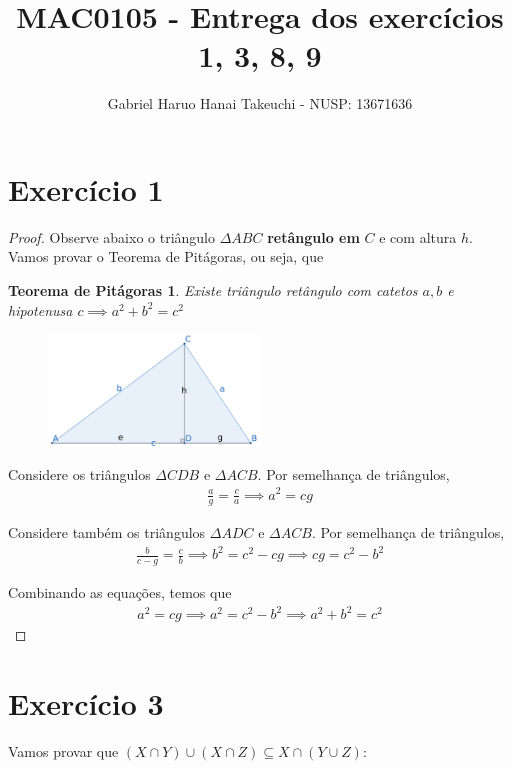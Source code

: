 \documentclass{article}
\title{MAC0105 - Entrega dos exercícios 1, 3, 8, 9}
\author{Gabriel Haruo Hanai Takeuchi - NUSP: 13671636}
\date{}
\newtheorem*{pit}{Teorema de Pitágoras}
\begin{document}
\maketitle

\section*{Exercício 1}

\begin{proof}
Observe abaixo o triângulo $\Delta ABC$ \textbf{retângulo em }$C$ e com altura $h$.
Vamos provar o Teorema de Pitágoras, ou seja, que
\begin{pit}
    Existe triângulo retângulo com catetos $a, b$ e hipotenusa $c \implies a^2 + b^2 = c^2$
\end{pit}

\begin{figure}[h]
    \centering
    \includegraphics[width=0.5\textwidth]{triangulo.png}
\end{figure}

Considere os triângulos $\Delta CDB$ e $\Delta ACB$. Por semelhança de triângulos,
\begin{align*}
    \frac{a}{g} = \frac{c}{a} \implies a^2 = cg
\end{align*}

Considere também os triângulos $\Delta ADC$ e $\Delta ACB$. Por semelhança de triângulos,
\begin{align*}
    \frac{b}{c-g} = \frac{c}{b} \implies b^2 = c^2 - cg \implies cg = c^2 - b^2
\end{align*}

Combinando as equações, temos que
\begin{align*}
    a^2 = cg \implies a^2 = c^2 - b^2 \implies a^2 + b^2 = c^2
\end{align*}
\end{proof}


\section*{Exercício 3}

Vamos provar que $ (X \cap Y) \cup (X \cap Z) \subseteq X \cap (Y \cup Z)$:
\end{document}
